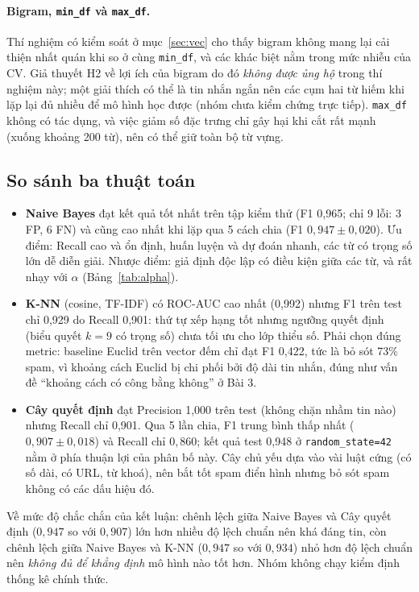 \documentclass[12pt,a4paper]{article}
\begin{document}
\paragraph{Bigram, \texttt{min\_df} và \texttt{max\_df}.} Thí nghiệm có kiểm soát ở mục~\ref{sec:vec} cho thấy bigram không mang lại cải thiện nhất quán khi so ở cùng \texttt{min\_df}, và các khác biệt nằm trong mức nhiễu của CV. Giả thuyết H2 về lợi ích của bigram do đó \emph{không được ủng hộ} trong thí nghiệm này; một giải thích có thể là tin nhắn ngắn nên các cụm hai từ hiếm khi lặp lại đủ nhiều để mô hình học được (nhóm chưa kiểm chứng trực tiếp). \texttt{max\_df} không có tác dụng, và việc giảm số đặc trưng chỉ gây hại khi cắt rất mạnh (xuống khoảng 200 từ), nên có thể giữ toàn bộ từ vựng.

\subsection{So sánh ba thuật toán}
\begin{itemize}[nosep]
\item \textbf{Naive Bayes} đạt kết quả tốt nhất trên tập kiểm thử (F1 0,965; chỉ 9 lỗi: 3 FP, 6 FN) và cũng cao nhất khi lặp qua 5 cách chia (F1 $0{,}947\pm0{,}020$). Ưu điểm: Recall cao và ổn định, huấn luyện và dự đoán nhanh, các từ có trọng số lớn dễ diễn giải. Nhược điểm: giả định độc lập có điều kiện giữa các từ, và rất nhạy với $\alpha$ (Bảng~\ref{tab:alpha}).
\item \textbf{K-NN} (cosine, TF-IDF) có ROC-AUC cao nhất (0,992) nhưng F1 trên test chỉ 0,929 do Recall 0,901: thứ tự xếp hạng tốt nhưng ngưỡng quyết định (biểu quyết $k=9$ có trọng số) chưa tối ưu cho lớp thiểu số. Phải chọn đúng metric: baseline Euclid trên vector đếm chỉ đạt F1 0,422, tức là bỏ sót 73\% spam, vì khoảng cách Euclid bị chi phối bởi độ dài tin nhắn, đúng như vấn đề ``khoảng cách có công bằng không'' ở Bài 3.
\item \textbf{Cây quyết định} đạt Precision 1,000 trên test (không chặn nhầm tin nào) nhưng Recall chỉ 0,901. Qua 5 lần chia, F1 trung bình thấp nhất ($0{,}907\pm0{,}018$) và Recall chỉ $0{,}860$; kết quả test 0,948 ở \texttt{random\_state=42} nằm ở phía thuận lợi của phân bố này. Cây chủ yếu dựa vào vài luật cứng (có số dài, có URL, từ khoá), nên bắt tốt spam điển hình nhưng bỏ sót spam không có các dấu hiệu đó.
\end{itemize}

Về mức độ chắc chắn của kết luận: chênh lệch giữa Naive Bayes và Cây quyết định ($0{,}947$ so với $0{,}907$) lớn hơn nhiều độ lệch chuẩn nên khá đáng tin, còn chênh lệch giữa Naive Bayes và K-NN ($0{,}947$ so với $0{,}934$) nhỏ hơn độ lệch chuẩn nên \emph{không đủ để khẳng định} mô hình nào tốt hơn. Nhóm không chạy kiểm định thống kê chính thức.
\end{document}
